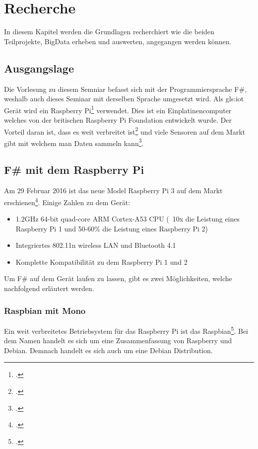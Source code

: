 
\chapter{Recherche}
In diesem Kapitel werden die Grundlagen recherchiert wie die beiden Teilprojekte, BigData erheben und auswerten, angegangen werden können.

\section{Ausgangslage}
Die Vorlesung zu diesem Semniar befasst sich mit der Programmiersprache F\#, weshalb auch dieses Seminar mit derselben Sprache umgesetzt wird. Als \Gls{gls:iot} Gerät wird ein Raspberry Pi\footcite{Raspberry_Pi_2016-04-24} verwendet. Dies ist ein Einplatinencomputer welches von der britischen Raspberry Pi Foundation entwickelt wurde. Der Vorteil daran ist, dass es weit verbreitet ist\footcite{Raspberry_Pi_Erfolgsgeschichte_2016-04-24} und viele Sensoren auf dem Markt gibt mit welchem man Daten sammeln kann\footcite{Raspberry_Pi_Sensor_2016-04-24}.

\section{F\# mit dem Raspberry Pi}
Am 29 Februar 2016 ist das neue Model Raspberry Pi 3 auf dem Markt erschienen\footcite{Raspberry_Pi_3_2016-04-24}. Einige Zahlen zu dem Gerät:

\begin{itemize}
\item 1.2GHz 64-bit quad-core ARM Cortex-A53 CPU (~10x die Leistung eines Raspberry Pi 1 und 50-60\% die Leistung eines Raspberry Pi 2)
\item Integriertes 802.11n wireless LAN und Bluetooth 4.1
\item Komplette Kompatibilität zu dem Raspberry Pi 1 und 2
\end{itemize} 

Um F\# auf dem Gerät laufen zu lassen, gibt es zwei Möglichkeiten, welche nachfolgend erläutert werden.

\subsection{Raspbian mit Mono}
Ein weit verbreitetes Betriebsystem für das Raspberry Pi ist das Raspbian\footcite{FrontPage_-_Raspbian_2016-04-24}. Bei dem Namen handelt es sich um eine Zusammenfassung von Raspberry und Debian. Demnach handelt es sich auch um eine Debian Distribution.

